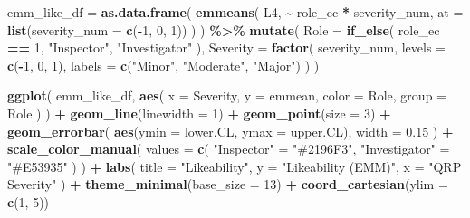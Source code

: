 \documentclass[
]{article}
\newenvironment{Shaded}{\begin{snugshade}}{\end{snugshade}}
\newcommand{\AttributeTok}[1]{\textcolor[rgb]{0.13,0.29,0.53}{#1}}
\newcommand{\DecValTok}[1]{\textcolor[rgb]{0.00,0.00,0.81}{#1}}
\newcommand{\FloatTok}[1]{\textcolor[rgb]{0.00,0.00,0.81}{#1}}
\newcommand{\FunctionTok}[1]{\textcolor[rgb]{0.13,0.29,0.53}{\textbf{#1}}}
\newcommand{\NormalTok}[1]{#1}
\newcommand{\OtherTok}[1]{\textcolor[rgb]{0.56,0.35,0.01}{#1}}
\newcommand{\SpecialCharTok}[1]{\textcolor[rgb]{0.81,0.36,0.00}{\textbf{#1}}}
\newcommand{\StringTok}[1]{\textcolor[rgb]{0.31,0.60,0.02}{#1}}
\begin{document}
\begin{Shaded}
\begin{Highlighting}[]
\NormalTok{emm\_like\_df }\OtherTok{=} \FunctionTok{as.data.frame}\NormalTok{(}
  \FunctionTok{emmeans}\NormalTok{(}
\NormalTok{    L4,}
    \SpecialCharTok{\textasciitilde{}}\NormalTok{ role\_ec }\SpecialCharTok{*}\NormalTok{ severity\_num,}
    \AttributeTok{at =} \FunctionTok{list}\NormalTok{(}\AttributeTok{severity\_num =} \FunctionTok{c}\NormalTok{(}\SpecialCharTok{{-}}\DecValTok{1}\NormalTok{, }\DecValTok{0}\NormalTok{, }\DecValTok{1}\NormalTok{))}
\NormalTok{  )}
\NormalTok{) }\SpecialCharTok{\%\textgreater{}\%}
  \FunctionTok{mutate}\NormalTok{(}
    \AttributeTok{Role =} \FunctionTok{if\_else}\NormalTok{(}
\NormalTok{      role\_ec }\SpecialCharTok{==} \DecValTok{1}\NormalTok{,}
      \StringTok{"Inspector"}\NormalTok{,}
      \StringTok{"Investigator"}
\NormalTok{    ),}
    \AttributeTok{Severity =} \FunctionTok{factor}\NormalTok{(}
\NormalTok{      severity\_num,}
      \AttributeTok{levels =} \FunctionTok{c}\NormalTok{(}\SpecialCharTok{{-}}\DecValTok{1}\NormalTok{, }\DecValTok{0}\NormalTok{, }\DecValTok{1}\NormalTok{),}
      \AttributeTok{labels =} \FunctionTok{c}\NormalTok{(}\StringTok{"Minor"}\NormalTok{, }\StringTok{"Moderate"}\NormalTok{, }\StringTok{"Major"}\NormalTok{)}
\NormalTok{    )}
\NormalTok{  )}

\FunctionTok{ggplot}\NormalTok{(}
\NormalTok{  emm\_like\_df,}
  \FunctionTok{aes}\NormalTok{(}
    \AttributeTok{x =}\NormalTok{ Severity,}
    \AttributeTok{y =}\NormalTok{ emmean,}
    \AttributeTok{color =}\NormalTok{ Role,}
    \AttributeTok{group =}\NormalTok{ Role}
\NormalTok{  )}
\NormalTok{) }\SpecialCharTok{+}
  \FunctionTok{geom\_line}\NormalTok{(}\AttributeTok{linewidth =} \DecValTok{1}\NormalTok{) }\SpecialCharTok{+}
  \FunctionTok{geom\_point}\NormalTok{(}\AttributeTok{size =} \DecValTok{3}\NormalTok{) }\SpecialCharTok{+}
  \FunctionTok{geom\_errorbar}\NormalTok{(}
    \FunctionTok{aes}\NormalTok{(}\AttributeTok{ymin =}\NormalTok{ lower.CL, }\AttributeTok{ymax =}\NormalTok{ upper.CL),}
    \AttributeTok{width =} \FloatTok{0.15}
\NormalTok{  ) }\SpecialCharTok{+}
  \FunctionTok{scale\_color\_manual}\NormalTok{(}
    \AttributeTok{values =} \FunctionTok{c}\NormalTok{(}
      \StringTok{"Inspector"} \OtherTok{=} \StringTok{"\#2196F3"}\NormalTok{,}
      \StringTok{"Investigator"} \OtherTok{=} \StringTok{"\#E53935"}
\NormalTok{    )}
\NormalTok{  ) }\SpecialCharTok{+}
  \FunctionTok{labs}\NormalTok{(}
    \AttributeTok{title =} \StringTok{"Likeability"}\NormalTok{,}
    \AttributeTok{y =} \StringTok{"Likeability (EMM)"}\NormalTok{,}
    \AttributeTok{x =} \StringTok{"QRP Severity"}
\NormalTok{  ) }\SpecialCharTok{+}
  \FunctionTok{theme\_minimal}\NormalTok{(}\AttributeTok{base\_size =} \DecValTok{13}\NormalTok{) }\SpecialCharTok{+}
  \FunctionTok{coord\_cartesian}\NormalTok{(}\AttributeTok{ylim =} \FunctionTok{c}\NormalTok{(}\DecValTok{1}\NormalTok{, }\DecValTok{5}\NormalTok{))}
\end{Highlighting}
\end{Shaded}
\end{document}
